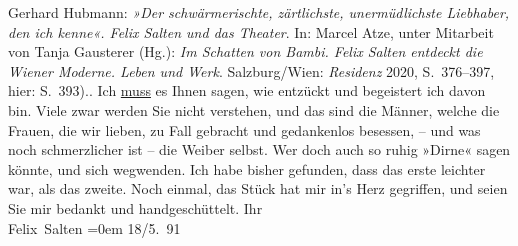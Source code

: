 \begin{ledgroupsized}[t]{13cm}
{{{                     Gerhard Hubmann: \emph{»Der schwärmerischte, zärtlichste,
                        unermüdlichste Liebhaber, den ich kenne«. Felix Salten und das
                        Theater}. In: Marcel Atze, unter Mitarbeit von Tanja Gausterer (Hg.):
                        \emph{Im Schatten von Bambi. Felix Salten entdeckt die Wiener
                        Moderne. Leben und Werk}.
                     Salzburg/Wien:
                        \emph{Residenz}{ }2020, S. 376–397, hier: S. 393).}}}\label{K_L03101-1h}. Ich
                  \uline{muss} es Ihnen sagen, wie entzückt und begeistert
               ich davon bin. Viele zwar werden Sie nicht verstehen, und das sind die Männer, welche
               die Frauen, die wir lieben, zu Fall gebracht und gedankenlos besessen, – und was noch
               schmerzlicher ist – die Weiber selbst.\pend
           \pstart
           Wer doch auch so ruhig »Dirne« sagen könnte, und sich wegwenden. Ich habe bisher
               gefunden, dass das erste {\pb}leichter war, als das zweite.\pend
           \pstart
           Noch einmal, das Stück hat mir
               in’s Herz gegriffen, und seien Sie mir bedankt und handgeschüttelt.\pend
           \pstart
           Ihr{\\[\baselineskip]}\spacefill\mbox{Felix Salten}\pend
           \leftskip=0em{}\pstart
           \raggedleft{}18/5. 91\pend
           
         
         \endnumbering{}\end{ledgroupsized}  \newcommand{\dateiname}{L03101}\newcommand{\titel}{Felix Salten an Arthur Schnitzler, 18. 5. 1891}\newcommand{\editorInnen}{Martin Anton Müller und Laura Untner}
      